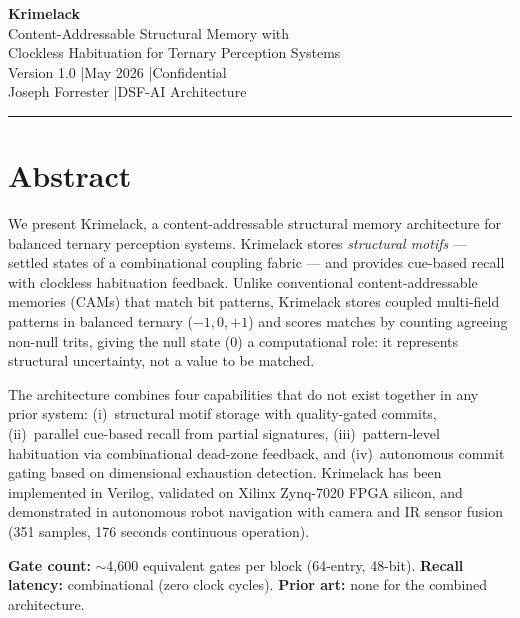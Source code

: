 \documentclass[11pt, a4paper]{article}
\begin{document}
\begin{center}
  {\LARGE \textbf{Krimelack}}\\[6pt]
  {\large Content-Addressable Structural Memory with}\\[2pt]
  {\large Clockless Habituation for Ternary Perception Systems}\\[10pt]
  {\color{nm-gray}\small Version 1.0 \quad|\quad May 2026 \quad|\quad Confidential}\\[4pt]
  {\color{nm-gray}\small Joseph Forrester \quad|\quad DSF-AI Architecture}
\end{center}

\vspace{1em}
\hrule
\vspace{1em}

\section*{Abstract}

We present Krimelack, a content-addressable structural memory
architecture for balanced ternary perception systems. Krimelack
stores \textit{structural motifs} --- settled states of a
combinational coupling fabric --- and provides cue-based recall
with clockless habituation feedback. Unlike conventional
content-addressable memories (CAMs) that match bit patterns,
Krimelack stores coupled multi-field patterns in balanced ternary
($-1, 0, +1$) and scores matches by counting agreeing non-null
trits, giving the null state ($0$) a computational role: it
represents structural uncertainty, not a value to be matched.

The architecture combines four capabilities that do not exist
together in any prior system: (i)~structural motif storage with
quality-gated commits, (ii)~parallel cue-based recall from partial
signatures, (iii)~pattern-level habituation via combinational
dead-zone feedback, and (iv)~autonomous commit gating based on
dimensional exhaustion detection. Krimelack has been implemented
in Verilog, validated on Xilinx Zynq-7020 FPGA silicon, and
demonstrated in autonomous robot navigation with camera and IR
sensor fusion (351 samples, 176 seconds continuous operation).

\textbf{Gate count:} $\sim$4,600 equivalent gates per block
(64-entry, 48-bit). \textbf{Recall latency:} combinational
(zero clock cycles). \textbf{Prior art:} none for the combined
architecture.

\tableofcontents
\end{document}

